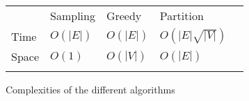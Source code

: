 \begin{figure}[H]
\centering
\begin{tabular}{lllll}
\cline{2-4}
\multicolumn{1}{l|}{}       & \multicolumn{1}{l|}{Sampling} & \multicolumn{1}{l|}{Greedy} & \multicolumn{1}{l|}{Partition}          &  \\ \cline{1-4}
\multicolumn{1}{|l|}{Time}  & \multicolumn{1}{l|}{$O(|E|)$}   & \multicolumn{1}{l|}{$O(|E|)$} & \multicolumn{1}{l|}{$O(|E|\sqrt{|V|})$} &  \\ \cline{1-4}
\multicolumn{1}{|l|}{Space} & \multicolumn{1}{l|}{$O(1)$}     & \multicolumn{1}{l|}{$O(|V|)$}   & \multicolumn{1}{l|}{$O(|E|)$}             &  \\ \cline{1-4}
                            &                               &                             &                                         & 
\end{tabular}
\caption{Complexities of the different algorithms}
\end{figure}